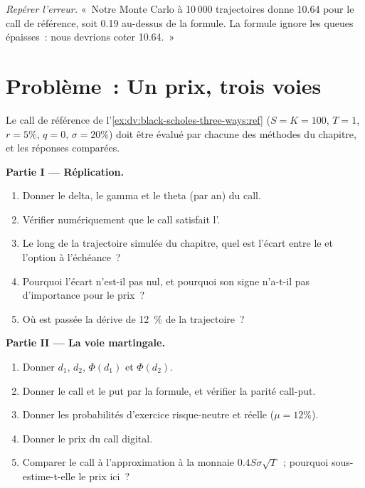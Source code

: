 \begin{exercise}[$\star\star\star$]\label{exo:dv:black-scholes-three-ways:8}
\emph{Repérer l'erreur.} «~Notre Monte Carlo à 10\,000 trajectoires donne 10.64 pour le
call de référence, soit 0.19 au-dessus de la formule. La formule ignore les queues épaisses~: nous
devrions coter 10.64.~»
\end{exercise}

\section{Problème~: Un prix, trois voies}

\begin{problem}\label{pb:dv:black-scholes-three-ways:1}
Le call de référence de l'\cref{ex:dv:black-scholes-three-ways:ref} ($S=K=100$,
$T=1$, $r=5\%$, $q=0$, $\sigma=20\%$) doit être évalué par chacune des méthodes du
chapitre, et les réponses comparées.

\medskip\noindent\textbf{Partie I --- Réplication.}
\begin{enumerate}
\item Donner le delta, le gamma et le theta (par an) du call.
\item Vérifier numériquement que le call satisfait l'.
\item Le long de la trajectoire simulée du chapitre, quel est l'écart entre le
 et l'option à l'échéance~?
\item Pourquoi l'écart n'est-il pas nul, et pourquoi son signe n'a-t-il pas d'importance pour le prix~?
\item Où est passée la dérive de 12~\% de la trajectoire~?
\end{enumerate}

\medskip\noindent\textbf{Partie II --- La voie martingale.}
\begin{enumerate}[resume]
\item Donner $d_1$, $d_2$, $\Phi(d_1)$ et $\Phi(d_2)$.
\item Donner le call et le put par la formule, et vérifier la parité call-put.
\item Donner les probabilités d'exercice risque-neutre et réelle ($\mu=12\%$).
\item Donner le prix du call digital.
\item Comparer le call à l'approximation à la monnaie $0.4S\sigma\sqrt T$~; pourquoi
sous-estime-t-elle le prix ici~?
\end{enumerate}


\end{problem}
